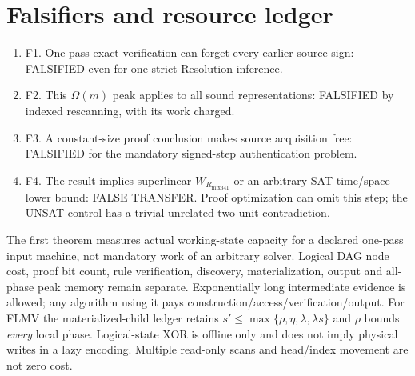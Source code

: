 \documentclass[11pt]{article}
\begin{document}
\section*{Falsifiers and resource ledger}
\begin{enumerate}
\item[] F1. One-pass exact verification can forget every earlier source sign: FALSIFIED even for one strict Resolution inference.
\item[] F2. This $\Omega(m)$ peak applies to all sound representations: FALSIFIED by indexed rescanning, with its work charged.
\item[] F3. A constant-size proof conclusion makes source acquisition free: FALSIFIED for the mandatory signed-step authentication problem.
\item[] F4. The result implies superlinear $W_{R_{\mathrm{mix341}}}$ or an arbitrary SAT time/space lower bound: FALSE TRANSFER. Proof optimization can omit this step; the UNSAT control has a trivial unrelated two-unit contradiction.
\end{enumerate}
The first theorem measures actual working-state capacity for a declared one-pass input machine, not mandatory work of an arbitrary solver. Logical DAG node cost, proof bit count, rule verification, discovery, materialization, output and all-phase peak memory remain separate. Exponentially long intermediate evidence is allowed; any algorithm using it pays construction/access/verification/output. For FLMV the materialized-child ledger retains $s'\le\max\{\rho,\eta,\lambda,\lambda s\}$ and $\rho$ bounds \emph{every} local phase. Logical-state XOR is offline only and does not imply physical writes in a lazy encoding. Multiple read-only scans and head/index movement are not zero cost.
\end{document}
